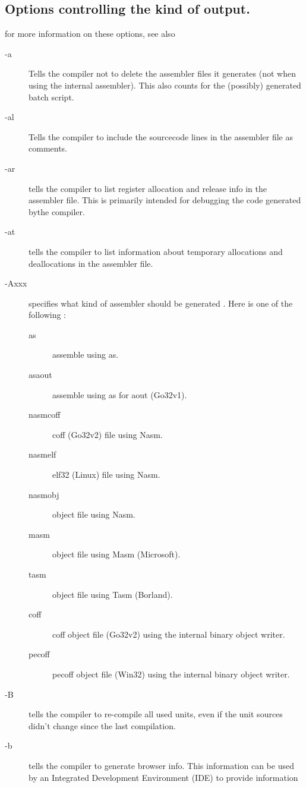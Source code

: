 \documentclass{book}
\begin{document}
\subsection{Options controlling the kind of output.}
for more information on these options, see also \progref
\begin{description}
\item [-a]  Tells the compiler not to delete the assembler files
it generates (not when using the internal assembler).
This also counts for the (possibly) generated batch script.
\item [-al]  Tells the compiler to include the sourcecode lines
in the assembler file as comments.
\item[-ar]  tells the compiler to list register allocation and
release info in the assembler file. This is primarily intended for debugging
the code generated bythe compiler.
\item[-at]  tells the compiler to list information about
temporary allocations and deallocations in the assembler file.
\item [-Axxx]  specifies what kind of assembler should be generated . Here
 is one of the following :
\begin{description}
\item[as] assemble using \gnu as.
\item[asaout] assemble using \gnu as for aout (Go32v1).
\item[nasmcoff] coff (Go32v2) file using Nasm.
\item[nasmelf] elf32 (Linux) file using Nasm.
\item[nasmobj] object file using Nasm.
\item[masm] object file using Masm (Microsoft).
\item[tasm] object file using Tasm (Borland).
\item[coff] coff object file (Go32v2) using the internal binary object writer.
\item[pecoff] pecoff object file (Win32) using the internal binary object writer.
\end{description}
\item[-B]  tells the compiler to re-compile all used units, even
if the unit sources didn't change since the last compilation.
\item[-b]  tells the compiler to generate browser info. This information can
be used by an Integrated Development Environment (IDE) to provide information

\end{description}
\end{document}
